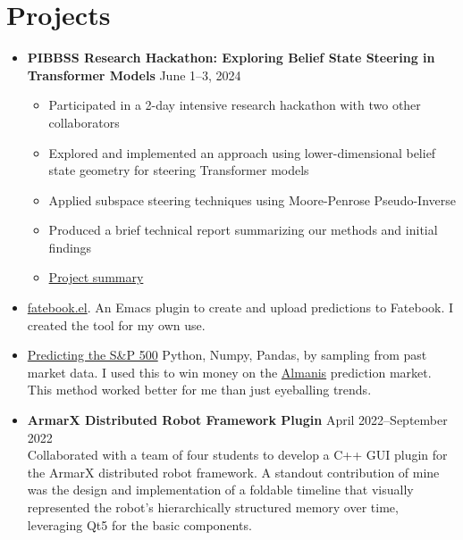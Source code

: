 \documentclass[letterpaper,10pt]{article}
\begin{document}
\section*{Projects}
\begin{itemize}
    \item \textbf{PIBBSS Research Hackathon: Exploring Belief State Steering in Transformer Models} \hfill June 1--3, 2024 \\
      \begin{itemize}
          \item Participated in a 2-day intensive research hackathon with two other collaborators
          \item Explored and implemented an approach using lower-dimensional belief state geometry for steering Transformer models
          \item Applied subspace steering techniques using Moore-Penrose Pseudo-Inverse
          \item Produced a brief technical report summarizing our methods and initial findings
          \item \href{https://example.com/hackathon-belief-state-steering.pdf}{Project summary}
      \end{itemize}
	\item \href{https://github.com/sonofhypnos/fatebook.el}{fatebook.el}. An Emacs plugin to create and upload predictions to Fatebook. I created the tool for my own use.
	\item \href{https://sonofhypnos.github.io/blog/prediction/python/2021/01/30/sp500.html}{Predicting the S\&P 500} Python, Numpy, Pandas, by sampling from past market data. I used this to win money on the \href{https://www.almanisprivate.com/}{Almanis} prediction market. This method worked better for me than just eyeballing trends.
  \item \textbf{ArmarX Distributed Robot Framework Plugin} \hfill April 2022--September 2022 \\
        Collaborated with a team of four students to develop a C++ GUI plugin for the
        ArmarX distributed robot framework. A standout contribution of mine was the
        design and implementation of a foldable timeline that visually represented the
        robot's hierarchically structured memory over time, leveraging Qt5 for the basic components.
\end{itemize}




\unless\ifdefined\EAVersion
\end{document}
